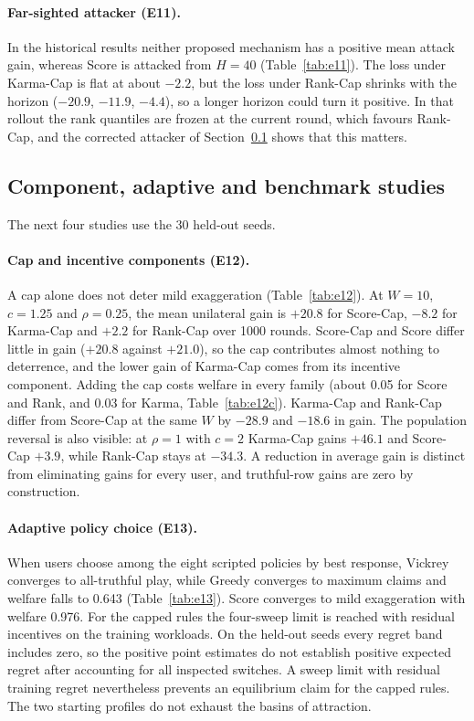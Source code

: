 \documentclass{article}
\theoremstyle{plain}
\theoremstyle{definition}
\begin{document}
\paragraph{Far-sighted attacker (E11).}
In the historical results neither proposed mechanism has a positive mean attack gain, whereas Score is attacked from $H=40$ (Table~\ref{tab:e11}).
The loss under Karma-Cap is flat at about $-2.2$, but the loss under Rank-Cap shrinks with the horizon ($-20.9$, $-11.9$, $-4.4$), so a longer horizon could turn it positive.
In that rollout the rank quantiles are frozen at the current round, which favours Rank-Cap, and the corrected attacker of Section~\ref{sec:course} shows that this matters.



\subsection{Component, adaptive and benchmark studies}
\label{sec:course}

The next four studies use the 30 held-out seeds.

\paragraph{Cap and incentive components (E12).}
A cap alone does not deter mild exaggeration (Table~\ref{tab:e12}).
At $W=10$, $c=1.25$ and $\rho=0.25$, the mean unilateral gain is $+20.8$ for Score-Cap, $-8.2$ for Karma-Cap and $+2.2$ for Rank-Cap over 1000 rounds.
Score-Cap and Score differ little in gain ($+20.8$ against $+21.0$), so the cap contributes almost nothing to deterrence, and the lower gain of Karma-Cap comes from its incentive component.
Adding the cap costs welfare in every family (about 0.05 for Score and Rank, and 0.03 for Karma, Table~\ref{tab:e12c}).
Karma-Cap and Rank-Cap differ from Score-Cap at the same $W$ by $-28.9$ and $-18.6$ in gain.
The population reversal is also visible: at $\rho=1$ with $c=2$ Karma-Cap gains $+46.1$ and Score-Cap $+3.9$, while Rank-Cap stays at $-34.3$.
A reduction in average gain is distinct from eliminating gains for every user, and truthful-row gains are zero by construction.




\paragraph{Adaptive policy choice (E13).}
When users choose among the eight scripted policies by best response, Vickrey converges to all-truthful play, while Greedy converges to maximum claims and welfare falls to 0.643 (Table~\ref{tab:e13}).
Score converges to mild exaggeration with welfare 0.976.
For the capped rules the four-sweep limit is reached with residual incentives on the training workloads.
On the held-out seeds every regret band includes zero, so the positive point estimates do not establish positive expected regret after accounting for all inspected switches.
A sweep limit with residual training regret nevertheless prevents an equilibrium claim for the capped rules.
The two starting profiles do not exhaust the basins of attraction.
\end{document}
